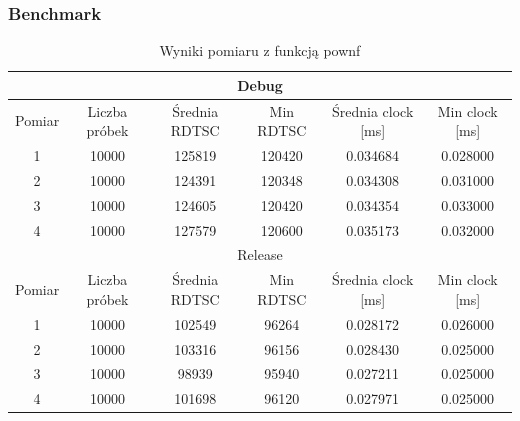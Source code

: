 \documentclass[12pt]{report}
\begin{document}
	\subsubsection{Benchmark}
	\begin{table}[H]
		\centering
		\caption{Wyniki pomiaru z funkcją pownf}
		\begin{tabular}{|c|c|c|c|c|c|} \hline
			\multicolumn{6}{|c|}{Debug} \\\hline
			Pomiar  & Liczba próbek & Średnia RDTSC & Min RDTSC & Średnia clock [ms] & Min clock [ms] \\\hline
			1 & 10000 & 125819 & 120420 & 0.034684 & 0.028000 \\\hline
			2 & 10000 & 124391 & 120348 & 0.034308 & 0.031000 \\\hline
			3 & 10000 & 124605 & 120420 & 0.034354 & 0.033000 \\\hline
			4 & 10000 & 127579 & 120600 & 0.035173 & 0.032000 \\\hline
			\hline
			\multicolumn{6}{|c|}{Release} \\\hline
			Pomiar  & Liczba próbek & Średnia RDTSC & Min RDTSC & Średnia clock [ms] & Min clock [ms] \\\hline
			1 & 10000 & 102549 & 96264 & 0.028172 & 0.026000 \\\hline
			2 & 10000 & 103316 & 96156 & 0.028430 & 0.025000 \\\hline
			3 & 10000 & 98939 & 95940 & 0.027211 & 0.025000 \\\hline
			4 & 10000 & 101698 & 96120 & 0.027971 & 0.025000 \\\hline
		\end{tabular}
	\end{table}
	
\end{document}
